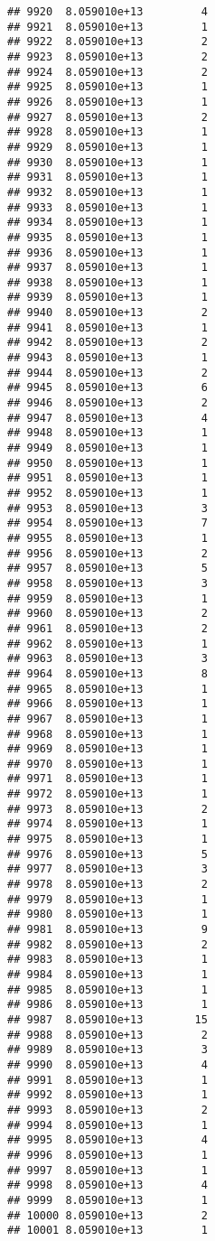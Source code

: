 \documentclass[
]{article}
\begin{document}
\begin{verbatim}
## 9920  8.059010e+13         4
## 9921  8.059010e+13         1
## 9922  8.059010e+13         2
## 9923  8.059010e+13         2
## 9924  8.059010e+13         2
## 9925  8.059010e+13         1
## 9926  8.059010e+13         1
## 9927  8.059010e+13         2
## 9928  8.059010e+13         1
## 9929  8.059010e+13         1
## 9930  8.059010e+13         1
## 9931  8.059010e+13         1
## 9932  8.059010e+13         1
## 9933  8.059010e+13         1
## 9934  8.059010e+13         1
## 9935  8.059010e+13         1
## 9936  8.059010e+13         1
## 9937  8.059010e+13         1
## 9938  8.059010e+13         1
## 9939  8.059010e+13         1
## 9940  8.059010e+13         2
## 9941  8.059010e+13         1
## 9942  8.059010e+13         2
## 9943  8.059010e+13         1
## 9944  8.059010e+13         2
## 9945  8.059010e+13         6
## 9946  8.059010e+13         2
## 9947  8.059010e+13         4
## 9948  8.059010e+13         1
## 9949  8.059010e+13         1
## 9950  8.059010e+13         1
## 9951  8.059010e+13         1
## 9952  8.059010e+13         1
## 9953  8.059010e+13         3
## 9954  8.059010e+13         7
## 9955  8.059010e+13         1
## 9956  8.059010e+13         2
## 9957  8.059010e+13         5
## 9958  8.059010e+13         3
## 9959  8.059010e+13         1
## 9960  8.059010e+13         2
## 9961  8.059010e+13         2
## 9962  8.059010e+13         1
## 9963  8.059010e+13         3
## 9964  8.059010e+13         8
## 9965  8.059010e+13         1
## 9966  8.059010e+13         1
## 9967  8.059010e+13         1
## 9968  8.059010e+13         1
## 9969  8.059010e+13         1
## 9970  8.059010e+13         1
## 9971  8.059010e+13         1
## 9972  8.059010e+13         1
## 9973  8.059010e+13         2
## 9974  8.059010e+13         1
## 9975  8.059010e+13         1
## 9976  8.059010e+13         5
## 9977  8.059010e+13         3
## 9978  8.059010e+13         2
## 9979  8.059010e+13         1
## 9980  8.059010e+13         1
## 9981  8.059010e+13         9
## 9982  8.059010e+13         2
## 9983  8.059010e+13         1
## 9984  8.059010e+13         1
## 9985  8.059010e+13         1
## 9986  8.059010e+13         1
## 9987  8.059010e+13        15
## 9988  8.059010e+13         2
## 9989  8.059010e+13         3
## 9990  8.059010e+13         4
## 9991  8.059010e+13         1
## 9992  8.059010e+13         1
## 9993  8.059010e+13         2
## 9994  8.059010e+13         1
## 9995  8.059010e+13         4
## 9996  8.059010e+13         1
## 9997  8.059010e+13         1
## 9998  8.059010e+13         4
## 9999  8.059010e+13         1
## 10000 8.059010e+13         2
## 10001 8.059010e+13         1

\end{verbatim}
\end{document}
